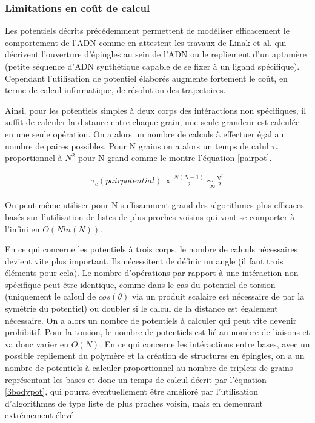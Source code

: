 \documentclass[a4paper,11pt]{article}
\begin{document}
\subsubsection*{Limitations en coût de calcul}

Les potentiels décrits précédemment permettent de modéliser efficacement le comportement de l'ADN comme en attestent les travaux de Linak et al. \cite{jchem} qui décrivent l'ouverture d'épingles au sein de l'ADN ou le repliement d'un aptamère (petite séquence d'ADN synthétique capable de se fixer à un ligand spécifique). Cependant l'utilisation de potentiel élaborés augmente fortement le coût, en terme de calcul informatique, de résolution des trajectoires.

Ainsi, pour les potentiels simples à deux corps des intéractions non spécifiques, il suffit de calculer la distance entre chaque grain, une seule grandeur est calculée en une seule opération. On a alors un nombre de calculs à effectuer égal au nombre de paires possibles. Pour N grains on a alors un temps de calul $\tau_c$ proportionnel à $N^2$ pour N grand comme le montre l'équation \ref{pairpot}.

\begin{eqnarray}
\tau_c(pairpotential) \propto \frac{N(N-1)}{2} \underset{+\infty}{\sim} \frac{N^2}{2}
\label{pairpot}
\end{eqnarray}

On peut même utiliser pour N suffisamment grand des algorithmes plus efficaces basés sur l'utilisation de listes de plus proches voisins \cite{Vaidya1989} qui vont se comporter à l'infini en $O(Nln(N))$.

En ce qui concerne les potentiels à trois corps, le nombre de calculs nécessaires devient vite plus important. Ils nécessitent de définir un angle (il faut trois éléments pour cela). Le nombre d'opérations par rapport à une intéraction non spécifique peut être identique, comme dans le cas du potentiel de torsion (uniquement le calcul de $cos(\theta)$ via un produit scalaire est nécessaire de par la symétrie du potentiel) ou doubler si le calcul de la distance est également nécessaire. On a alors un nombre de potentiels à calculer qui peut vite devenir prohibitif. Pour la torsion, le nombre de potentiels est lié au nombre de liaisons et va donc varier en $O(N)$. En ce qui concerne les intéractions entre bases, avec un possible repliement du polymère et la création de structures en épingles, on a un nombre de potentiels à calculer proportionnel au nombre de triplets de grains représentant les bases et donc un temps de calcul décrit par l'équation \ref{3bodypot}, qui pourra éventuellement être amélioré par l'utilisation d'algorithmes de type liste de plus proches voisin, mais en demeurant extrémement élevé.
\end{document}
